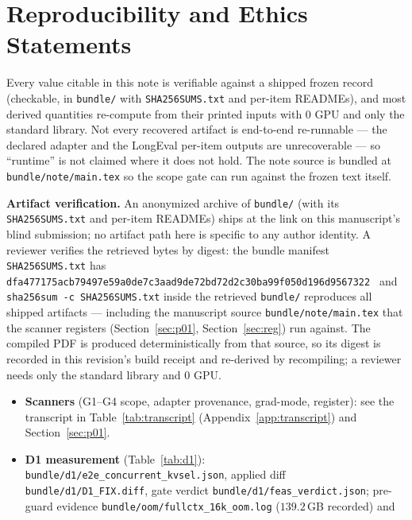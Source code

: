 \documentclass{article}
\newcommand{\zb}{\discretionary{}{}{}}
\newcommand{\code}[1]{\texttt{#1}}
\begin{document}
\section{Reproducibility and Ethics Statements}\label{sec:repro}
{\footnotesize
Every value citable in this note is verifiable against a shipped frozen record (checkable, in
\code{bundle/} with \code{SHA256SUMS.txt} and per-item READMEs), and most derived quantities
re-compute from their printed inputs with 0 GPU and only the standard library. Not every
recovered artifact is end-to-end re-runnable --- the declared adapter and the LongEval per-item
outputs are unrecoverable --- so ``runtime'' is not claimed where it does not hold. The note
source is bundled at
\code{bundle/note/main.tex} so the scope gate can run against the frozen text itself.

\textbf{Artifact verification.} An anonymized archive of \code{bundle/} (with its
\code{SHA256SUMS.txt} and per-item READMEs) ships at the link on this manuscript's blind
submission; no artifact path here is specific to any author identity. A reviewer verifies the
retrieved bytes by digest: the bundle manifest \code{SHA256SUMS.txt} has
\texttt{\zb dfa477175acb79497e59a0de7c3aad9de72bd72d2c30ba99f050d196d9567322 \zb}
and \code{sha256sum -c SHA256SUMS.txt} inside the retrieved \code{bundle/} reproduces all shipped
artifacts --- including the manuscript source \code{bundle/note/main.tex} that the scanner
registers (Section~\ref{sec:p01}, Section~\ref{sec:reg}) run against. The compiled PDF is
produced deterministically from that source, so its digest is recorded in this revision's build
receipt and re-derived by recompiling; a reviewer needs only the standard library and 0 GPU.
\begin{itemize}\itemsep0pt\parskip0pt\raggedright
  \item \textbf{Scanners} (G1--G4 scope, adapter provenance, grad-mode, register): see the
        transcript in Table~\ref{tab:transcript} (Appendix~\ref{app:transcript}) and
        Section~\ref{sec:p01}.
  \item \textbf{D1 measurement} (Table~\ref{tab:d1}):
        \code{bundle/d1/\zb e2e\_concurrent\_kvsel.json}, applied diff
        \code{bundle/d1/D1\_FIX.diff}, gate verdict \code{bundle/d1/\zb feas\_verdict.json};
        pre-guard evidence \code{bundle/oom/\zb fullctx\_16k\_oom.log} ($139.2$\,GB recorded) and

\end{itemize}}
\end{document}
